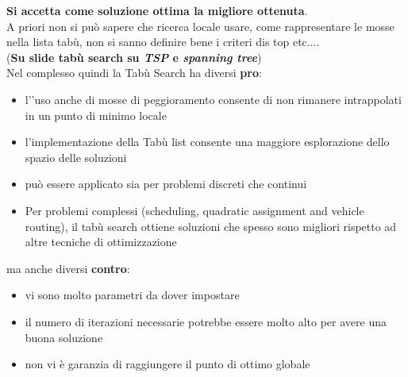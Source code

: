 \documentclass[a4paper,12pt, oneside]{book}
\begin{document}
\textbf{Si accetta come soluzione ottima la migliore ottenuta}.\\
A priori non si può sapere che ricerca locale usare, come
rappresentare le mosse nella lista tabù, non si sanno definire bene i
criteri dis top etc$\ldots$. \\
(\textbf{Su slide tabù search su \textit{TSP} e \textit{spanning
    tree}})\\
Nel complesso quindi la Tabù Search ha diversi \textbf{pro}:
\begin{itemize}
  \item l'’uso anche di mosse di peggioramento consente di non
  rimanere intrappolati in un punto di minimo locale
  \item l'implementazione della Tabù list consente una maggiore
  esplorazione dello spazio delle soluzioni 
  \item può essere applicato sia per problemi discreti che continui
  \item Per problemi complessi (scheduling, quadratic assignment and
  vehicle routing), il tabù search ottiene soluzioni che spesso sono
  migliori rispetto ad altre tecniche di ottimizzazione 
\end{itemize}
ma anche diversi \textbf{contro}:
\begin{itemize}
  \item vi sono molto parametri da dover impostare
  \item il numero di iterazioni necessarie potrebbe essere molto alto
  per avere una buona soluzione
  \item non vi è garanzia di raggiungere il punto di ottimo globale
\end{itemize}
\end{document}
